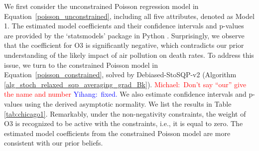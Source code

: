 \documentclass[aos]{imsart}
\numberwithin{equation}{section}
\theoremstyle{plain}
\newcommand{\michael}[1]{\textcolor{red}{Michael:\ #1}}
\newcommand{\yihang}[1]{\textcolor{blue}{Yihang:\ #1}}
\begin{document}
\begin{table}[h]
  \centering
  \caption{Summary of Poisson regression (Model 2) on Chicago air pollution and death rate data}
\label{tab:chicago2}
    \end{table}


We first consider the unconstrained Poisson regression model in Equation~\eqref{poisson_unconstrained}, including all five attributes, denoted as Model 1. The estimated model coefficients and their confidence intervals and p-values are provided by the `statsmodels' package in Python \cite{seabold2010statsmodels}. Surprisingly, we observe that the coefficient for O3 is significantly negative, which contradicts our prior understanding of the likely impact of air pollution on death rates. To address this issue, we turn to the constrained Poisson model in Equation~\eqref{poisson_constrained}, solved by Debiased-StoSQP-v2 (Algorithm \ref{alg_stoch_relaxed_sqp_averaging_grad_Bk}). 
\michael{Don't say ``our'' give the name and number} \yihang{fixed.}
We also estimate confidence intervals and p-values using the derived asymptotic normality. We list the results in Table \ref{tab:chicago1}. Remarkably, under the non-negativity constraints, the weight of O3 is recognized to be active with the constraints, i.e., it is equal to zero. The estimated model coefficients from the constrained Poisson model are more consistent with our prior beliefs. 
\end{document}
